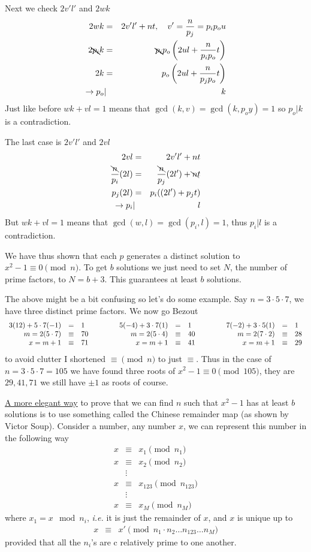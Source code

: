 \documentclass[aps,preprint,preprintnumbers,nofootinbib,showpacs,prd]{revtex4-1}
\newcommand{\ie}{{\it i.e.} }
\newcommand{\ba}{\begin{array}}
\newcommand{\ea}{\end{array}}
\newcommand{\nbea}{\begin{eqnarray*}}
\newcommand{\neea}{\end{eqnarray*}}
\begin{document}
Next we check $2v'l'$ and $2wk$
%
\nbea
2wk & = & 2v'l' +nt , ~~~ v' = \frac{n}{p_j} = p_i p_o u\\
2 \bcancel{p_i}k & = & \bcancel{p_i}p_o \left (2 ul + \frac{n}{p_i p_o}t \right ) \\
2 k & = & p_o \left (2 ul + \frac{n}{p_j p_o}t \right ) \\
\to p_o & | & k
\neea
%
Just like before $wk + vl = 1$ means that $\gcd(k,v)  = \gcd(k,p_o y)= 1$ so $p_o | k$ is a contradiction.

The last case is  $2v'l'$ and $2vl$
%
\nbea
2vl & = & 2v'l' +nt \\
\frac{\bcancel{n}}{p_i}(2l) & = & \frac{\bcancel{n}}{p_j}(2 l') + \bcancel{n}t \\
p_j(2l) & = & p_i ((2 l') + p_j t) \\
\to p_i & | & l
\neea
%
But $wk + vl = 1$ means that $\gcd(w,l) = \gcd(p_i,l) = 1$, thus $p_i|l$ is a contradiction.

We have thus shown that each $p$ generates a distinct solution to $x^2 - 1 \equiv 0 \pmod{n}$. To get $b$ solutions we just need to set $N$, the number of prime factors, to $N = b + 3$. This guarantees at least $b$ solutions.

The above might be a bit confusing so let's do some example. Say $n = 3 \cdot 5 \cdot 7$, we have three distinct prime factors. We now go Bezout
%
\nbea
\ba{r c l c r c l c r c l}
3 (12) + 5\cdot 7 (-1) & = & 1 & ~~~~~~~ & 5 (-4) + 3\cdot 7 (1) & = & 1 & ~~~~~~~ & 7 (-2) + 3\cdot 5 (1) & = & 1  \\
m = 2  (5 \cdot 7) & \equiv & 70 & & m = 2 (5 \cdot 4) & \equiv & 40 & & m = 2 (7 \cdot 2) & \equiv & 28 \\
x = m + 1 & \equiv & 71 & & x = m + 1 & \equiv & 41 & & x = m + 1 & \equiv & 29 
\ea
\neea
%
to avoid clutter I shortened $\equiv \pmod{n}$ to just $\equiv$. Thus in the case of $n = 3 \cdot 5 \cdot 7 = 105$ we have found three roots of $x^2 - 1 \equiv 0 \pmod{105}$, they are $29,41,71$ we still have $\pm1$ as roots of course.

\underline{A more elegant way} to prove that we can find $n$ such that $x^2-1$ has at least $b$ solutions is to use something called the Chinese remainder map (as shown by Victor Soup). Consider a number, any number $x$, we can represent this number in the following way
%
\nbea
x & \equiv & x_{1} \pmod{n_{1}} \\
x & \equiv & x_{2} \pmod{n_{2}} \\
 & \vdots & \\
x & \equiv & x_{123} \pmod{n_{123}} \\
& \vdots & \\
x & \equiv & x_{M} \pmod{n_{M}}
\neea
%
where $x_1 = x \mod n_i$, \ie it is just the remainder of $x$, and $x$ is unique up to
%
\nbea
x & \equiv & x' \pmod{n_1 \cdot n_2 \dots n_{123} \dots n_M}
\neea
%
provided that all the $n_i$'s are c relatively prime to one another.
\end{document}
